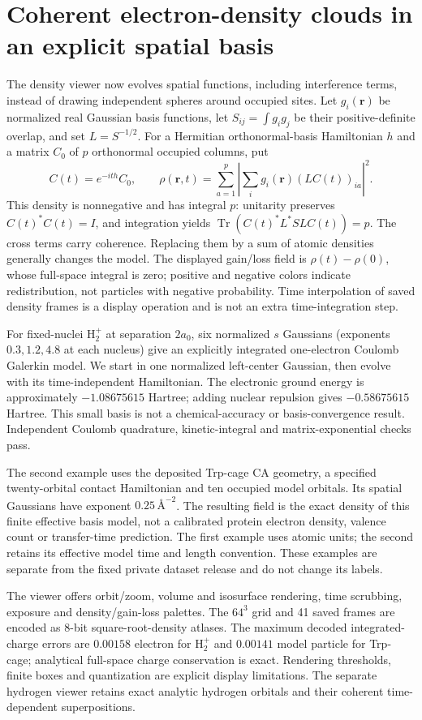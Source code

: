 \section{Coherent electron-density clouds in an explicit spatial basis}
The density viewer now evolves spatial functions, including interference
terms, instead of drawing independent spheres around occupied sites. Let
$g_i(\mathbf r)$ be normalized real Gaussian basis functions, let
$S_{ij}=\int g_i g_j$ be their positive-definite overlap, and set
$L=S^{-1/2}$. For a Hermitian orthonormal-basis Hamiltonian $h$ and a matrix
$C_0$ of $p$ orthonormal occupied columns, put
\[
 C(t)=e^{-ith}C_0,\qquad
 \rho(\mathbf r,t)=\sum_{a=1}^p
       \left|\sum_i g_i(\mathbf r)(LC(t))_{ia}\right|^2.
\]
This density is nonnegative and has integral $p$: unitarity preserves
$C(t)^*C(t)=I$, and integration yields
$\operatorname{Tr}(C(t)^*L^*SL C(t))=p$. The cross terms carry coherence.
Replacing them by a sum of atomic densities generally changes the model.
The displayed gain/loss field is $\rho(t)-\rho(0)$, whose full-space integral
is zero; positive and negative colors indicate redistribution, not particles
with negative probability. Time interpolation of saved density frames is a
display operation and is not an extra time-integration step.

For fixed-nuclei $\mathrm H_2^+$ at separation $2a_0$, six normalized $s$
Gaussians (exponents $0.3,1.2,4.8$ at each nucleus) give an explicitly
integrated one-electron Coulomb Galerkin model. We start in one normalized
left-center Gaussian, then evolve with its time-independent Hamiltonian.
The electronic ground energy is approximately $-1.08675615$ Hartree;
adding nuclear repulsion gives $-0.58675615$ Hartree. This small basis is not
a chemical-accuracy or basis-convergence result. Independent Coulomb
quadrature, kinetic-integral and matrix-exponential checks pass.

The second example uses the deposited Trp-cage CA geometry, a specified
twenty-orbital contact Hamiltonian and ten occupied model orbitals. Its
spatial Gaussians have exponent $0.25\,\text{\AA}^{-2}$. The resulting field
is the exact density of this finite effective basis model, not a calibrated
protein electron density, valence count or transfer-time prediction.
The first example uses atomic units; the second retains its effective model
time and length convention. These examples are separate from the fixed
private dataset release and do not change its labels.

The viewer offers orbit/zoom, volume and isosurface rendering, time scrubbing,
exposure and density/gain-loss palettes. The $64^3$ grid and 41 saved frames
are encoded as 8-bit square-root-density atlases. The maximum decoded
integrated-charge errors are $0.00158$ electron for $\mathrm H_2^+$ and
$0.00141$ model particle for Trp-cage; analytical full-space charge
conservation is exact. Rendering thresholds, finite boxes and quantization
are explicit display limitations. The separate hydrogen viewer retains exact
analytic hydrogen orbitals and their coherent time-dependent superpositions.
